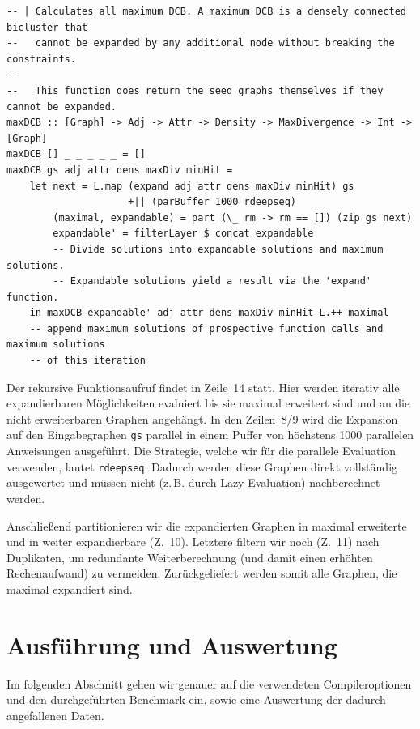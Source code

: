 \documentclass[a4paper]{scrartcl}
\begin{document}
\begin{lstlisting}[caption={Die maxDCB-Funktion},label=lst:maxDCB]
-- | Calculates all maximum DCB. A maximum DCB is a densely connected bicluster that
--   cannot be expanded by any additional node without breaking the constraints.
--   
--   This function does return the seed graphs themselves if they cannot be expanded.
maxDCB :: [Graph] -> Adj -> Attr -> Density -> MaxDivergence -> Int -> [Graph]
maxDCB [] _ _ _ _ _ = []
maxDCB gs adj attr dens maxDiv minHit =
    let next = L.map (expand adj attr dens maxDiv minHit) gs
                     +|| (parBuffer 1000 rdeepseq)
        (maximal, expandable) = part (\_ rm -> rm == []) (zip gs next)
        expandable' = filterLayer $ concat expandable
        -- Divide solutions into expandable solutions and maximum solutions.
        -- Expandable solutions yield a result via the 'expand' function.
    in maxDCB expandable' adj attr dens maxDiv minHit L.++ maximal
    -- append maximum solutions of prospective function calls and maximum solutions
    -- of this iteration
\end{lstlisting}

Der rekursive Funktionsaufruf findet in Zeile~14 statt. Hier werden iterativ alle expandierbaren Möglichkeiten evaluiert bis sie maximal erweitert sind und an die nicht erweiterbaren Graphen angehängt. In den Zeilen~8/9 wird die Expansion auf den Eingabegraphen \texttt{gs} parallel in einem Puffer von höchstens 1000 parallelen Anweisungen ausgeführt. Die Strategie, welche wir für die parallele Evaluation verwenden, lautet \texttt{rdeepseq}. Dadurch werden diese Graphen direkt vollständig ausgewertet und müssen nicht (z.\,B. durch Lazy Evaluation) nachberechnet werden.\par
\medskip
Anschließend partitionieren wir die expandierten Graphen in maximal erweiterte und in weiter expandierbare (Z.~10). Letztere filtern wir noch (Z.~11) nach Duplikaten, um redundante Weiterberechnung (und damit einen erhöhten Rechenaufwand) zu vermeiden. Zurückgeliefert werden somit alle Graphen, die maximal expandiert sind. \par


\section{Ausführung und Auswertung}
Im folgenden Abschnitt gehen wir genauer auf die verwendeten Compileroptionen und den durchgeführten Benchmark ein, sowie eine Auswertung der dadurch angefallenen Daten.
\end{document}
